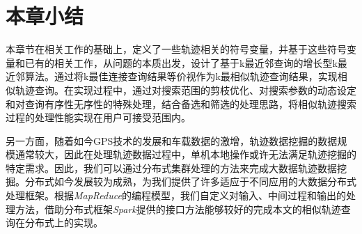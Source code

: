 



\section{本章小结}
\label{sec:implementation conclusion}
本章节在相关工作的基础上，定义了一些轨迹相关的符号变量，并基于这些符号变量和已有的相关工作，从问题的本质出发，设计了基于k最近邻查询的增长型k最近邻算法。通过将k最佳连接查询结果等价视作为k最相似轨迹查询结果，实现相似轨迹查询。在实现过程中，通过对搜索范围的剪枝优化、对搜索参数的动态设定和对查询有序性无序性的特殊处理，结合备选和筛选的处理思路，将相似轨迹搜索过程的处理性能实现在用户可接受范围内。

另一方面，随着如今GPS技术的发展和车载数据的激增，轨迹数据挖掘的数据规模通常较大，因此在处理轨迹数据过程中，单机本地操作或许无法满足轨迹挖掘的特定需求。因此，我们可以通过分布式集群处理的方法来完成大数据轨迹数据挖掘。分布式如今发展较为成熟，为我们提供了许多适应于不同应用的大数据分布式处理框架。根据\emph{MapReduce}的编程模型，我们自定义对输入、中间过程和输出的处理方法，借助分布式框架\emph{Spark}提供的接口方法能够较好的完成本文的相似轨迹查询在分布式上的实现。